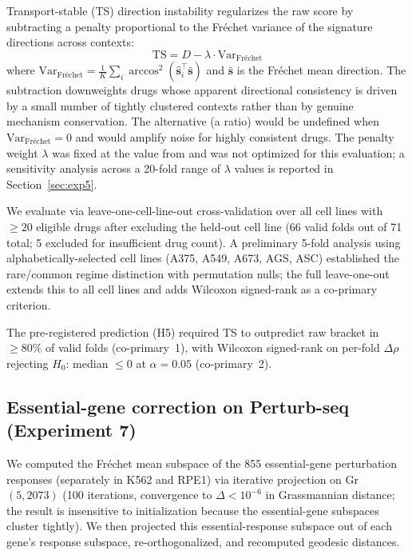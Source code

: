 \documentclass[11pt]{article}
\begin{document}
Transport-stable (TS) direction instability regularizes the raw score by
subtracting a penalty proportional to the Fr\'{e}chet variance of the
signature directions across contexts:
\begin{equation}
  \text{TS} = D - \lambda \cdot \text{Var}_{\text{Fr\'echet}}
  \label{eq:ts}
\end{equation}
where $\text{Var}_{\text{Fr\'echet}} = \frac{1}{K}\sum_i
\arccos^2(\hat{\mathbf{s}}_i^\top \bar{\mathbf{s}})$ and
$\bar{\mathbf{s}}$ is the Fr\'echet mean direction. The subtraction downweights drugs whose apparent directional consistency
is driven by a small number of tightly clustered contexts rather than by
genuine mechanism conservation. The alternative (a ratio) would be
undefined when $\text{Var}_{\text{Fr\'echet}} = 0$ and would amplify
noise for highly consistent drugs. The penalty weight $\lambda$ was fixed
at the value from \citet{tower2026drug} and was not optimized for this
evaluation; a sensitivity analysis across a 20-fold range of $\lambda$
values is reported in Section~\ref{sec:exp5}.

We evaluate via leave-one-cell-line-out cross-validation over all cell
lines with $\geq 20$ eligible drugs after excluding the held-out cell line
(66 valid folds out of 71 total; 5 excluded for insufficient drug count).
A preliminary 5-fold analysis using alphabetically-selected cell lines
(A375, A549, A673, AGS, ASC) established the rare/common regime distinction
with permutation nulls; the full leave-one-out extends this to all cell
lines and adds Wilcoxon signed-rank as a co-primary criterion.

The pre-registered prediction (H5) required TS to outpredict raw bracket
in $\geq 80\%$ of valid folds (co-primary~1), with Wilcoxon signed-rank on
per-fold $\Delta\rho$ rejecting $H_0$: median $\leq 0$ at $\alpha = 0.05$
(co-primary~2).

\subsection{Essential-gene correction on Perturb-seq (Experiment 7)}

We computed the Fr\'echet mean subspace of the 855 essential-gene
perturbation responses (separately in K562 and RPE1) via iterative
projection on Gr$(5, 2073)$ (100 iterations, convergence to
$\Delta < 10^{-6}$ in Grassmannian distance; the result is insensitive
to initialization because the essential-gene subspaces cluster tightly).
We then projected this essential-response subspace out of each gene's
response subspace, re-orthogonalized, and recomputed geodesic distances.
\end{document}
